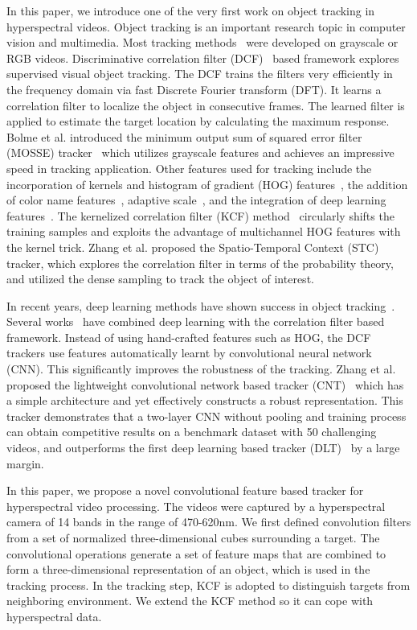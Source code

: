 \documentclass[runningheads,a4paper]{llncs}
\begin{document}
In this paper, we introduce one of the very first work on object tracking in hyperspectral videos. Object tracking is an important research topic in computer vision and multimedia. Most tracking methods~\cite{CN,ESK,KCF,STC,DLT} were developed on grayscale or RGB videos. Discriminative correlation filter (DCF)~\cite{CN,ESK,KCF,MOSSE} based framework explores supervised visual object tracking. The DCF trains the filters very efficiently in the frequency domain via fast Discrete Fourier transform (DFT). It learns a correlation filter to localize the object in consecutive frames. The learned filter is applied to estimate the target location by calculating the maximum response. Bolme et al. introduced the minimum output sum of squared error filter (MOSSE) tracker~\cite{MOSSE} which utilizes grayscale features and achieves an impressive speed in tracking application. Other features used for tracking include the incorporation of kernels and histogram of gradient (HOG) features~\cite{KCF}, the addition of color name features~\cite{CN}, adaptive scale~\cite{a4}, and the integration of deep learning features~\cite{a5}. The kernelized correlation filter (KCF) method~\cite{KCF} circularly shifts the training samples and exploits the advantage of multichannel HOG features with the kernel trick. Zhang et al. proposed the Spatio-Temporal Context (STC)~\cite{STC} tracker, which explores the correlation filter in terms of the probability theory, and utilized the dense sampling to track the object of interest.

In recent years, deep learning methods have shown success in object tracking~\cite{a6,a7,a8}. Several works~\cite{a9,a10} have combined deep learning with the correlation filter based framework. Instead of using hand-crafted features such as HOG, the DCF trackers use features automatically learnt by convolutional neural network (CNN). This significantly improves the robustness of the tracking. Zhang et al. proposed the lightweight convolutional network based tracker (CNT)~\cite{CNT} which has a simple architecture and yet effectively constructs a robust representation. This tracker demonstrates that a two-layer CNN without pooling and training process can obtain competitive results on a benchmark dataset with 50 challenging videos, and outperforms the first deep learning based tracker (DLT)~\cite{DLT} by a large margin.

In this paper, we propose a novel convolutional feature based tracker for hyperspectral video processing. The videos were captured by a hyperspectral camera of 14 bands in the range of 470-620nm. We first defined convolution filters from a set of normalized three-dimensional cubes surrounding a target. The convolutional operations generate a set of feature maps that are combined to form a three-dimensional representation of an object, which is used in the tracking process. In the tracking step, KCF is adopted to distinguish targets from neighboring environment. We extend the KCF method so it can cope with hyperspectral data.
\end{document}
